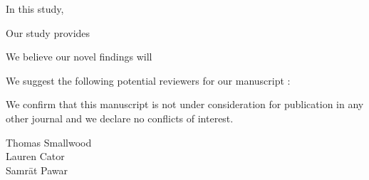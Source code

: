 \documentclass[blank]{impletter}
\begin{document}
In this study, %

Our study provides %

We believe our novel findings will %

We suggest the following potential reviewers for our manuscript
:


We confirm that this manuscript is not under consideration for publication in any other journal and we declare no conflicts of interest. 

{
\vspace{-40pt}

Thomas Smallwood\\
Lauren Cator\\
Samr\={a}t Pawar
}

{\footnotesize

}
\end{document}
